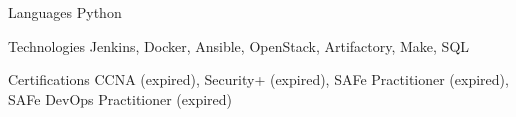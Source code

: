 
\begin{cvskills}
  \cvskill
    {Languages} %
    {Python} %

  \cvskill
    {Technologies} %
    {
        Jenkins,
        Docker,
        Ansible,
        OpenStack,
        Artifactory,
        Make,
        SQL
    } %

  \cvskill
    {Certifications}
    {CCNA (expired), Security+ (expired), SAFe Practitioner (expired), SAFe DevOps Practitioner (expired)}

\end{cvskills}

